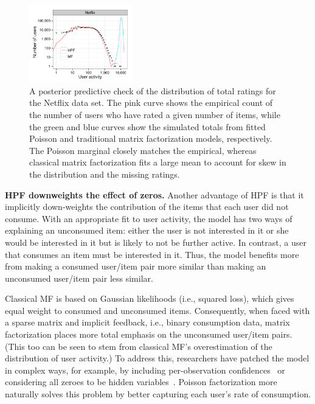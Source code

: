 \begin{figure}[t!]
  \centering
  \includegraphics[width=0.4\textwidth]{figures/user_activity_sim_netflix.pdf}
  \caption{A posterior predictive check of the distribution of total
    ratings for the Netflix data set.  The pink curve shows the
    empirical count of the number of users who have rated a given
    number of items, while the green and blue curves show the
    simulated totals from fitted Poisson and traditional matrix
    factorization models, respectively. The Poisson marginal closely
    matches the empirical, whereas classical matrix factorization fits
    a large mean to account for skew in the distribution and the
    missing ratings.}
\label{fig:marginals}
\end{figure}

{\bf HPF downweights the effect of zeros.}  Another advantage of HPF
is that it implicitly down-weights the contribution of the items that
each user did not consume.  With an appropriate fit to user activity,
the model has two ways of explaining an unconsumed item: either the
user is not interested in it or she would be interested in it but is
likely to not be further active. In contrast, a user that consumes an
item must be interested in it.  Thus, the model benefits more from
making a consumed user/item pair more similar than making an
unconsumed user/item pair less similar.

Classical MF is based on Gaussian likelihoods (i.e., squared loss),
which gives equal weight to consumed and unconsumed items.
Consequently, when faced with a sparse matrix and implicit feedback,
i.e., binary consumption data, matrix factorization places more total
emphasis on the unconsumed user/item pairs.  (This too can be seen to
stem from classical MF's overestimation of the distribution of user
activity.)  To address this, researchers have patched the model in
complex ways, for example, by including per-observation
confidences~\cite{Koren:2009} or considering all zeroes to be hidden
variables~\cite{Paquet:2013p9197}.  Poisson factorization more
naturally solves this problem by better capturing each user's rate of
consumption.

